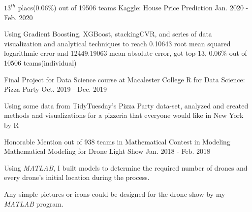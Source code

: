 

\begin{cventries}
  \cventry
    {$13^{th}$ placs(0.06\%) out of 19506 teams} %
    {Kaggle: House Price Prediction} %
    {} %
    {Jan. 2020 - Feb. 2020} %
    {
      \begin{cvitems} %
        \item {Using Gradient Boosting, XGBoost, stackingCVR, and series of data visualization and analytical techniques to reach 0.10643 root mean squared logarithmic error and 12449.19063 mean absolute error, got top 13, 0.06\% out of 10506 teams(individual)}
      \end{cvitems}
    }

  
  \cventry
    {Final Project for Data Science course at Macalester College} %
    {R for Data Science: Pizza Party} %
    {} %
    {Oct. 2019 - Dec. 2019} %
    {
      \begin{cvitems} %
        \item {Using some data from TidyTuesday’s Pizza Party data-set, analyzed and created methods and visualizations for a pizzeria that everyone would like in New York by R}
      \end{cvitems}
    }

  \cventry
    {Honorable Mention out of 938 teams in Mathematical Contest in Modeling} %
    {Mathematical Modeling for Drone Light Show} %
    {} %
    {Jan. 2018 - Feb. 2018} %
    {
      \begin{cvitems} %
        \item {Using \textit{MATLAB}, I built models to determine the required number of drones and every drone’s initial location during the process.}
        \item {Any simple pictures or icons could be designed for the drone show by my \textit{MATLAB} program.}
      \end{cvitems}
    }


\end{cventries}

